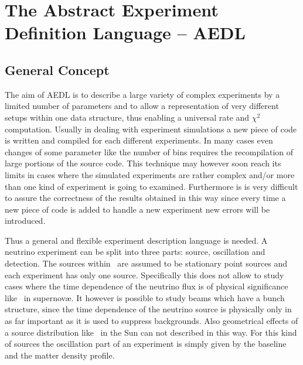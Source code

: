 
\part{The Abstract Experiment Definition Language -- AEDL}

\chapter{General Concept}

The aim of AEDL is to describe a large variety of complex experiments
by a limited number of parameters and to allow a representation of
very different setups within one data structure, thus enabling a
universal rate and $\chi^2$ computation. Usually in dealing with
experiment simulations a new piece of code is written and compiled
for each different experiments. In many cases even changes of some
parameter like the number of bins requires the recompilation of
large portions of the source code. This technique may however soon
reach its limits in cases where the simulated experiments are rather complex
and/or more than one kind of experiment is going to examined. Furthermore
is is very difficult to assure the correctness of the results obtained
in this way since every time a new piece of code is added to handle a new
experiment new errors will be introduced.

Thus a general and flexible experiment description language is needed. 
A neutrino experiment can be split into three parts: source, oscillation
and detection. The sources within \GLOBES\ are assumed to be stationary
point sources and each experiment has only one source. Specifically this
does not allow to study cases where the time dependence of the neutrino flux
is of physical significance like \eg\ in supernov\ae. It however is possible
to study beams which have a bunch structure, since the time dependence of the
neutrino source is physically only in as far important as it is used to
suppress backgrounds. Also geometrical effects of a source distribution like
\eg\ in the Sun can not described in this way. For this kind of sources
the oscillation part of an 
experiment is simply
given by the baseline and the matter density profile. 


